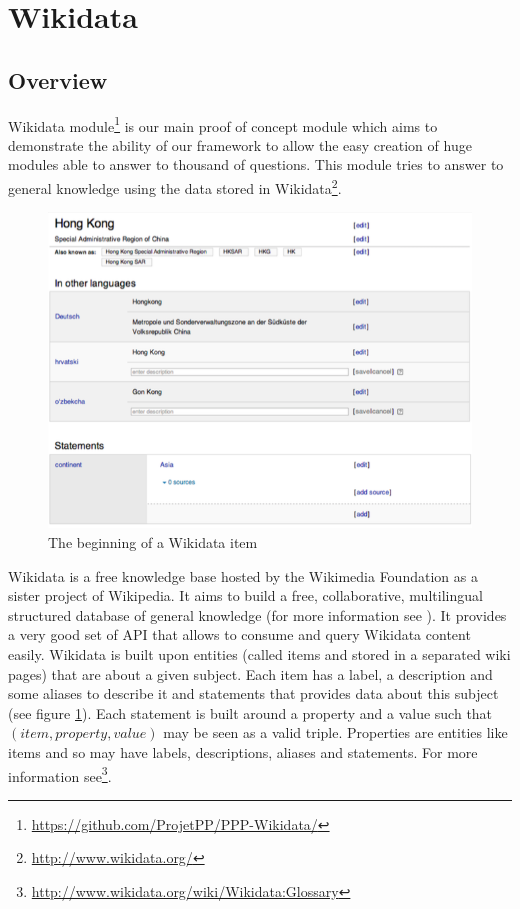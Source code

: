 \section{Wikidata}

\subsection{Overview}
Wikidata module\footnote{\url{https://github.com/ProjetPP/PPP-Wikidata/}} is our main proof of concept module which aims to demonstrate the ability of our framework to allow the easy creation of huge modules able to answer to thousand of questions. This module tries to answer to general knowledge using the data stored in Wikidata\footnote{\url{http://www.wikidata.org/}}.

\begin{figure}[!ht]
  \centering
    \label{wikidata:item-screenshot}
    \includegraphics[width=\textwidth]{./wikidata-item-screenshot.png}
    \caption{The beginning of a Wikidata item}
\end{figure}

Wikidata is a free knowledge base hosted by the Wikimedia Foundation as a sister project of Wikipedia. It aims to build a free, collaborative, multilingual structured database of general knowledge (for more information see \cite{42240}). It provides a very good set of API that allows to consume and query Wikidata content easily. Wikidata is built upon entities (called items and stored in a separated wiki pages) that are about a given subject. Each item has a label, a description and some aliases to describe it and statements that provides data about this subject (see figure \ref{wikidata:item-screenshot}). Each statement is built around a property and a value such that $(item, property, value)$ may be seen as a valid triple. Properties are entities like items and so may have labels, descriptions, aliases and statements. For more information see\footnote{\url{http://www.wikidata.org/wiki/Wikidata:Glossary}}.

